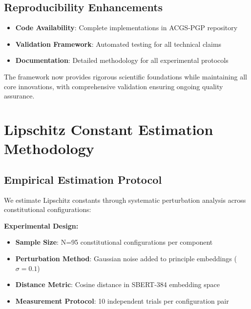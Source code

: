 \documentclass[sigconf,natbib]{acmart}
\begin{document}
\subsection{Reproducibility Enhancements}
\begin{itemize}
    \item \textbf{Code Availability}: Complete implementations in ACGS-PGP repository
    \item \textbf{Validation Framework}: Automated testing for all technical claims
    \item \textbf{Documentation}: Detailed methodology for all experimental protocols
\end{itemize}

The framework now provides rigorous scientific foundations while maintaining all core innovations, with comprehensive validation ensuring ongoing quality assurance.

\section{Lipschitz Constant Estimation Methodology}
\label{app:lipschitz_estimation}

\subsection{Empirical Estimation Protocol}
We estimate Lipschitz constants through systematic perturbation analysis across constitutional configurations:

\textbf{Experimental Design:}
\begin{itemize}
    \item \textbf{Sample Size}: N=95 constitutional configurations per component
    \item \textbf{Perturbation Method}: Gaussian noise added to principle embeddings ($\sigma = 0.1$)
    \item \textbf{Distance Metric}: Cosine distance in SBERT-384 embedding space
    \item \textbf{Measurement Protocol}: 10 independent trials per configuration pair
\end{itemize}
\end{document}
